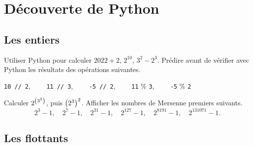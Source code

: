 \documentclass{magnoliaold}
\begin{document}

\section{Découverte de Python}


\subsection{Les entiers}

\begin{questions}
\question Utiliser Python pour calculer $2022 + 2$, $2^{10}$, $3^2-2^3$.
\question Prédire avant de vérifier avec Python les résultats des opérations suivantes.
  \begin{center}
  \verb_10 // 2_, $\qquad$\verb_11 // 3_, $\qquad$\verb_-5 // 2_, $\qquad$\verb_11_ \% \verb_3_, $\qquad$\verb_-5_ \% \verb_2_
  \end{center}
\question Calculer $2^{\left(3^2\right)}$, puis $\left(2^3\right)^2$.
\question Afficher les nombres de Mersenne premiers suivants.
  \[2^3-1,\quad 2^7-1,\quad 2^{31}-1,\quad 2^{127}-1,\quad 2^{8191}-1,\quad 2^{131071}-1.\]
\end{questions}
%

\subsection{Les flottants}
\end{document}
